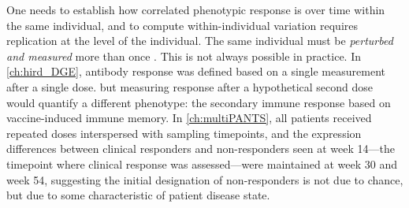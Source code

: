 One needs to establish how correlated phenotypic response is over time within the same individual,
and to compute within-individual variation requires replication at the level of the individual.
The same individual must be \emph{perturbed and measured} more than once \autocite{senn2016MasteringVariationVariance}.
This is not always possible in practice.
In \cref{ch:hird_DGE}, antibody response was defined based on a single measurement after a single dose.
but measuring response after a hypothetical second dose would quantify a different phenotype: 
the secondary immune response based on vaccine-induced immune memory.
In \cref{ch:multiPANTS}, all patients received repeated doses interspersed with sampling timepoints,
and the expression differences between clinical responders and non-responders seen at week 14---the timepoint where clinical response was assessed---were maintained at week 30 and week 54,
suggesting the initial designation of non-responders is not due to chance, but due to some characteristic of patient disease state.
%

